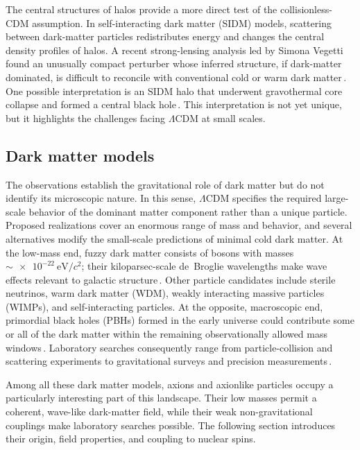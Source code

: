 The central structures of halos provide a more direct test of the collisionless-CDM assumption.
In self-interacting dark matter (SIDM) models, scattering between dark-matter particles redistributes energy and changes the central density profiles of halos.
A recent strong-lensing analysis led by Simona Vegetti found an unusually compact perturber whose inferred structure, if dark-matter dominated, is difficult to reconcile with conventional cold or warm dark matter\,\cite{Powell2025_MillionSolarMassObject}.
One possible interpretation is an SIDM halo that underwent gravothermal core collapse and formed a central black hole\,\cite{Vegetti2026_ChallengeCDMWDM}.
This interpretation is not yet unique, but it highlights the challenges facing $\Lambda$CDM at small scales.


\subsection{Dark matter models}

The observations establish the gravitational role of dark matter but do not identify its microscopic nature.
In this sense, $\Lambda$CDM specifies the required large-scale behavior of the dominant matter component rather than a unique particle.
Proposed realizations cover an enormous range of mass and behavior, and several alternatives modify the small-scale predictions of minimal cold dark matter.
At the low-mass end, fuzzy dark matter consists of bosons with masses $\sim\SI{e-22}{\eV/c^2}$; their kiloparsec-scale de~Broglie wavelengths make wave effects relevant to galactic structure\,\cite{Lam2017_PhysRevD}.
Other particle candidates include sterile neutrinos, warm dark matter (WDM), weakly interacting massive particles (WIMPs), and self-interacting particles.
At the opposite, macroscopic end, primordial black holes (PBHs) formed in the early universe could contribute some or all of the dark matter within the remaining observationally allowed mass windows\,\cite{Carr2020_PBH_DarkMatter}.
Laboratory searches consequently range from particle-collision and scattering experiments to gravitational surveys and precision measurements\,\cite{Kimball2023_search}.

Among all these dark matter models, axions and axionlike particles occupy a particularly interesting part of this landscape.
Their low masses permit a coherent, wave-like dark-matter field, while their weak non-gravitational couplings make laboratory searches possible.
The following section introduces their origin, field properties, and coupling to nuclear spins.

